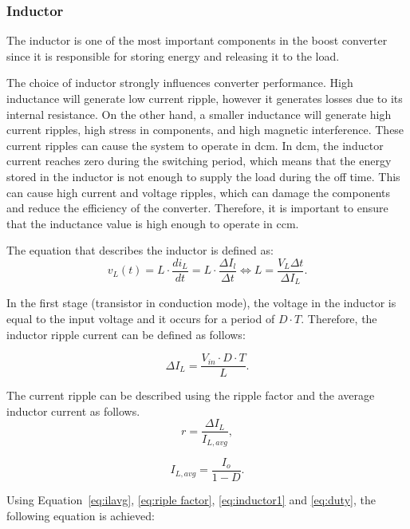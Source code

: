 \subsubsection{Inductor}
The inductor is one of the most important components in the boost converter since it is responsible for storing energy and releasing it to the load. 

The choice of inductor strongly influences converter performance. High inductance will generate low current ripple, however it generates losses due to its internal resistance. On the other hand, a smaller inductance will generate high current ripples, high stress in components, and high magnetic interference. These current ripples can cause the system to operate in \ac{dcm}. In \ac{dcm}, the inductor current reaches zero during the switching period, which means that the energy stored in the inductor is not enough to supply the load during the off time. This can cause high current and voltage ripples, which can damage the components and reduce the efficiency of the converter. Therefore, it is important to ensure that the inductance value is high enough to operate in \ac{ccm}.


The equation that describes the inductor is defined as:
\begin{equation}
    v_L(t) = L \cdot \frac{di_L}{dt} = L \cdot \frac{\Delta I_l}{\Delta t} \Leftrightarrow L = \frac{V_L \Delta t}{\Delta I_L}.
    \label{eq:inductor1}
\end{equation}

In the first stage (transistor in conduction mode), the voltage in the inductor is equal to the input voltage and it occurs for a period of $D \cdot T$. Therefore, the inductor ripple current can be defined as follows:

\begin{equation}
    \Delta I_L = \frac{V_{in} \cdot D \cdot T}{L} .
\end{equation}

The current ripple can be described using the ripple factor and the average inductor current as follows.
\begin{equation}
    r = \frac{\Delta I_L}{I_{L,avg}},
    \label{eq:riple factor}
\end{equation}

\begin{equation}
    I_{L,avg} = \frac{I_o}{1-D} .
    \label{eq:ilavg}
\end{equation}

Using Equation~\ref{eq:ilavg}, \ref{eq:riple factor}, \ref{eq:inductor1} and \ref{eq:duty}, the following equation is achieved:

